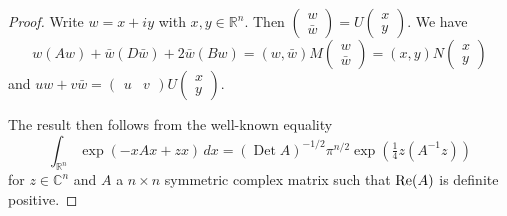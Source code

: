 \documentclass[12pt]{amsart}
\numberwithin{equation}{section}
\DeclareMathOperator{\Det}{Det} \DeclareMathOperator{\Tr}{Tr}
\begin{document}
\begin{proof} Write $w=x+iy$ with $x, y \in {\mathbb R}^n$. Then $\begin{pmatrix}w\\{\bar w}\end{pmatrix}=U\begin{pmatrix}x\\y\end{pmatrix}$. We have
\begin{equation*}w(Aw)+{\bar w}(D{\bar w})+2{\bar w}(Bw)=(w,{\bar w})M\begin{pmatrix}w\\{\bar w}\end{pmatrix}=(x,y)N\begin{pmatrix}x\\y\end{pmatrix}
\end{equation*} and $uw+v{\bar w}= \begin{pmatrix}u&v\end{pmatrix}U
\begin{pmatrix}x\\y\end{pmatrix}$.

The result then follows from the well-known equality
\begin{equation*}\int_{{\mathbb R}^n}\exp (-xAx+zx)\,dx=(\Det A)^{-1/2}\pi ^{n/2}
\exp\left(\tfrac{1}{4}z(A^{-1}z)\right)
\end{equation*} for $z\in {\mathbb C}^n$ and $A$ a $n\times n$ symmetric complex matrix such that $\operatorname{Re}(A)$ is definite positive.
\end{proof}
\end{document}
